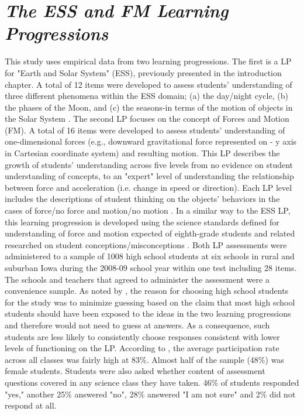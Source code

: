 \section{\em The ESS and FM Learning Progressions}
This study uses empirical data from two learning progressions. The first is a LP for "Earth and Solar System" (ESS), previously presented in the introduction chapter. A total of 12 items were developed to assess students' understanding of three different phenomena within the ESS domain; (a) the day/night cycle, (b) the phases of the Moon, and (c) the seasons-in terms of the motion of objects in the Solar System \cite{Briggs2006}. The second LP focuses on the concept of Forces and Motion (FM).  A total of 16 items were developed \cite{AlonzoSteedle2009} to assess students' understanding of one-dimensional forces (e.g., downward gravitational force represented on - y axis in Cartesian coordinate system) and resulting motion. This LP describes the growth of students' understanding across five levels from no evidence on student understanding of concepts, to an "expert" level of understanding the relationship between force and acceleration (i.e. change in speed or direction). Each LP level includes the descriptions of student thinking on the objects' behaviors in the cases of force/no force and motion/no motion \cite[p.~403-404]{AlonzoSteedle2009}. In a similar way to the ESS LP, this learning progression is developed using the science standards defined for understanding of force and motion expected of eighth-grade students and related researched on student conceptions/misconceptions \cite{AlonzoSteedle2009}. 
Both LP assessments were administered to a sample of 1008 high school students at six schools in rural and suburban Iowa during the 2008-09 school year within one test including 28 items. The schools and teachers that agreed to administer the assessment were a convenience sample. As noted by , the reason for choosing high school students for the study was to minimize guessing based on the claim that most high school students should have been exposed to the ideas in the two learning progressions and therefore would not need to guess at answers. As a consequence, such students are less likely to consistently choose responses consistent with lower levels of functioning on the LP.  
According to  , the average participation rate across all classes was fairly high at 83\%. Almost half of the sample (48\%) was female students. Students were also asked whether content of assessment questions covered in any science class they have taken. 46\% of students responded "yes," another 25\% answered "no", 28\% answered "I am not sure" and 2\% did not respond at all.

